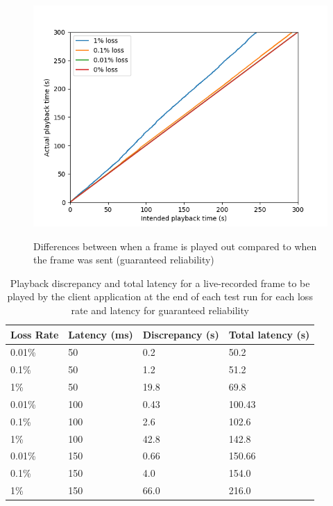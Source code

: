 \documentclass{mpaper}
\begin{document}
\begin{figure}
{   \includegraphics[scale=0.5]{images/graphics-reliable/150ms-relative-offsets-combined-reliable.png}
   \label{playback-offsets-rel-150}
 }
 \caption{Differences between when a frame is played out compared to when the frame was sent (guaranteed reliability)}
 \label{playback-offsets-rel}
\end{figure}

\begin{table}[h!]
\centering
\label{stalls-data-rel}
\begin{center}
\begin{tabular}{|p{1.5cm}|p{1.5cm}|p{2cm}|p{2cm}|}
\hline
Loss Rate & Latency (ms) & Discrepancy (s) & Total latency (s)\\ \hline
0.01\%  & 50 & 0.2 & 50.2 \\ \hline
0.1\%  & 50 & 1.2 & 51.2 \\ \hline
1\%  & 50 & 19.8 & 69.8 \\ \hline
0.01\%  & 100 & 0.43 & 100.43 \\ \hline
0.1\%  & 100 & 2.6 & 102.6 \\ \hline
1\%  & 100 & 42.8 & 142.8 \\ \hline
0.01\%  & 150 & 0.66 & 150.66 \\ \hline
0.1\%  & 150 & 4.0 & 154.0 \\ \hline
1\%  & 150 & 66.0 & 216.0 \\ \hline

\end{tabular}
\caption{Playback discrepancy and total latency for a live-recorded frame to be played by the client application at the end of each test run for each loss rate and latency for guaranteed reliability}
\label{relative-offset-table}
\end{center}
\end{table}
\end{document}
